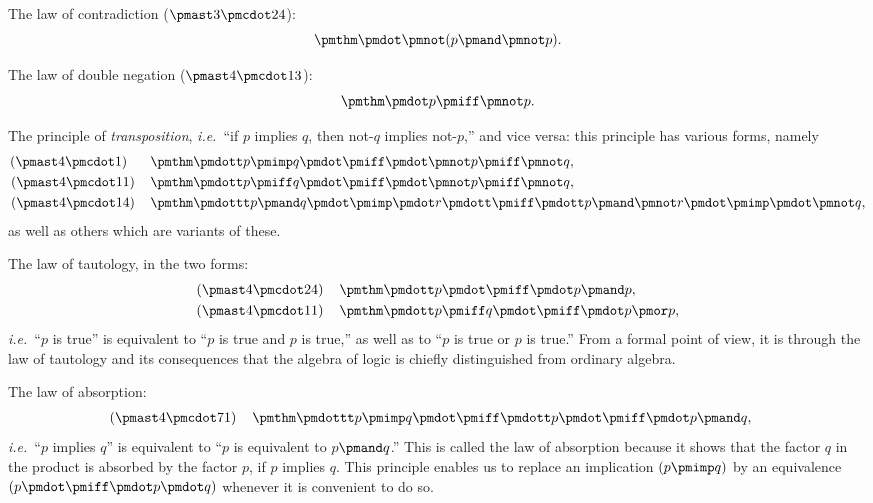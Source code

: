 \documentclass[letterpaper,12pt,openany,leqno]{book}
\newcommand{\pagefirst}[1]{\marginnote[\boxed{\text{#1}}]{\boxed{\text{#1}}}}
\begin{document}
The law of contradiction ($\pmast3\pmcdot24$):
\[
\pmthm \pmdot \pmnot(p \pmand \pmnot p).
\]

The law of double negation ($\pmast4\pmcdot13$):
\[
\pmthm \pmdot p \pmiff \pmnot p.
\]

The principle of \textit{transposition}, \textit{i.e.}\ ``if $p$ implies $q$, then not-$q$ implies not-$p$,'' and vice versa: this principle has various forms, namely
\begin{align*}
	(\pmast4\pmcdot1) \hspace{.6cm} & \pmthm\pmdott p\pmimp q\pmdot\pmiff\pmdot\pmnot p \pmiff \pmnot q, \\ 
	(\pmast4\pmcdot11) \hspace{.4cm} & \pmthm \pmdott p \pmiff q \pmdot \pmiff \pmdot \pmnot p \pmiff \pmnot q, \\ 
	(\pmast4\pmcdot14) \hspace{.4cm} & \pmthm \pmdottt p\pmand q\pmdot \pmimp\pmdot r\pmdott\pmiff\pmdott p \pmand \pmnot r \pmdot\pmimp\pmdot\pmnot q, 
\end{align*}
as well as others which are variants of these.

The law of tautology, in the two forms:
\begin{align*}
	(\pmast4\pmcdot24) \hspace{.4cm} & \pmthm\pmdott p \pmdot\pmiff\pmdot p \pmand p, \\ 
	(\pmast4\pmcdot11) \hspace{.4cm} & \pmthm \pmdott p \pmiff q \pmdot \pmiff \pmdot p \pmor p, 
\end{align*}
\textit{i.e.}\ ``$p$ is true'' is equivalent to ``$p$ is true and $p$ is true,'' as well as to ``$p$ is true or $p$ is true.'' From a formal point of view, it is through the law of tautology and its consequences that the algebra of logic is chiefly distinguished from ordinary algebra.

The law of absorption:
\begin{align*}
	(\pmast4\pmcdot71) \hspace{.4cm} & \pmthm\pmdottt p\pmimp q \pmdot\pmiff\pmdott p \pmdot \pmiff \pmdot p \pmand q, 
\end{align*}
\textit{i.e.}\ ``$p$ implies $q$'' is equivalent to ``$p$ is equivalent to $p$$\pmand q$.'' This is called the law of absorption because it shows that the factor $q$ in the  product is \pagefirst{15} absorbed by the factor $p$, if $p$ implies $q$. This principle enables us to replace an implication $(p \pmimp q)$ by an equivalence $(p \pmdot \pmiff \pmdot p \pmdot q)$ whenever it is convenient to do so.
\end{document}
